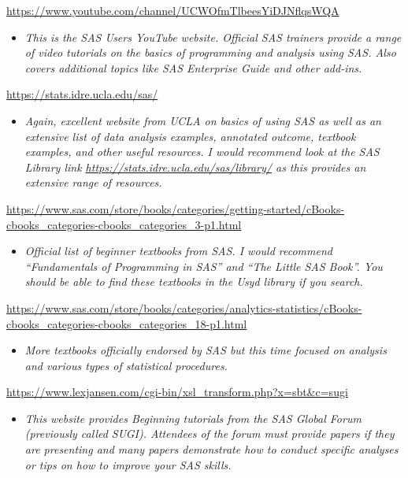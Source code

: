 \documentclass[
]{book}
\providecommand{\tightlist}{%
  \setlength{\itemsep}{0pt}\setlength{\parskip}{0pt}}
\begin{document}
\url{https://www.youtube.com/channel/UCWOfmTlbeesYiDJNflqsWQA}

\begin{itemize}
\tightlist
\item
  \emph{This is the SAS Users YouTube website. Official SAS trainers provide a range of video tutorials on the basics of programming and analysis using SAS. Also covers additional topics like SAS Enterprise Guide and other add-ins.}
\end{itemize}

\url{https://stats.idre.ucla.edu/sas/}

\begin{itemize}
\tightlist
\item
  \emph{Again, excellent website from UCLA on basics of using SAS as well as an extensive list of data analysis examples, annotated outcome, textbook examples, and other useful resources. I would recommend look at the SAS Library link \url{https://stats.idre.ucla.edu/sas/library/} as this provides an extensive range of resources.}
\end{itemize}

\url{https://www.sas.com/store/books/categories/getting-started/cBooks-cbooks_categories-cbooks_categories_3-p1.html}

\begin{itemize}
\tightlist
\item
  \emph{Official list of beginner textbooks from SAS. I would recommend ``Fundamentals of Programming in SAS'' and ``The Little SAS Book''. You should be able to find these textbooks in the Usyd library if you search.}
\end{itemize}

\url{https://www.sas.com/store/books/categories/analytics-statistics/cBooks-cbooks_categories-cbooks_categories_18-p1.html}

\begin{itemize}
\tightlist
\item
  \emph{More textbooks officially endorsed by SAS but this time focused on analysis and various types of statistical procedures.}
\end{itemize}

\url{https://www.lexjansen.com/cgi-bin/xsl_transform.php?x=sbt&c=sugi}

\begin{itemize}
\tightlist
\item
  \emph{This website provides Beginning tutorials from the SAS Global Forum (previously called SUGI). Attendees of the forum must provide papers if they are presenting and many papers demonstrate how to conduct specific analyses or tips on how to improve your SAS skills.}
\end{itemize}
\end{document}
